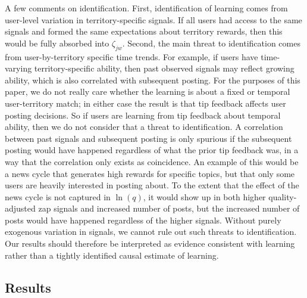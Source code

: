 A few comments on identification. First, identification of learning comes from user-level variation in territory-specific signals. If all users had access to the same signals and formed the same expectations about territory rewards, then this would be fully absorbed into $\zeta_{jw}$. Second, the main threat to identification comes from user-by-territory specific time trends. For example, if users have time-varying territory-specific ability, then past observed signals may reflect growing ability, which is also correlated with subsequent posting. For the purposes of this paper, we do not really care whether the learning is about a fixed or temporal user-territory match; in either case the result is that tip feedback affects user posting decisions. So if users are learning from tip feedback about temporal ability, then we do not consider that a threat to identification. A correlation between past signals and subsequent posting is only spurious if the subsequent posting would have happened regardless of what the prior tip feedback was, in a way that the correlation only exists as coincidence. An example of this would be a news cycle that generates high rewards for specific topics, but that only some users are heavily interested in posting about. To the extent that the effect of the news cycle is not captured in $\ln(q)$, it would show up in both higher quality-adjusted zap signals and increased number of posts, but the increased number of posts would have happened regardless of the higher signals. Without purely exogenous variation in signals, we cannot rule out such threats to identification. Our results should therefore be interpreted as evidence consistent with learning rather than a tightly identified causal estimate of learning.

\subsection{Results}

